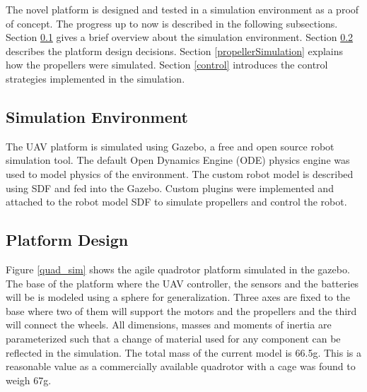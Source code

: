 \documentclass[12pt,a4paper]{report}
\begin{document}
The novel platform is designed and tested in a simulation environment as a proof of concept. The progress up to now is described in the following subsections. Section \ref{simulationEnvironment} gives a brief overview about the simulation environment. Section \ref{platformDesign} describes the platform design decisions. Section \ref{propellerSimulation} explains how the propellers were simulated. Section \ref{control} introduces the control strategies implemented in the simulation.

\subsection{Simulation Environment}
\label{simulationEnvironment}
The UAV platform is simulated using Gazebo, a free and open source robot simulation tool. The default Open Dynamics Engine (ODE) physics engine was used to model physics of the environment. The custom robot model is described using SDF and fed into the Gazebo. Custom plugins were implemented and attached to the robot model SDF to simulate propellers and control the robot.   

\subsection{Platform Design}
\label{platformDesign}
Figure \ref{quad_sim} shows the agile quadrotor platform simulated in the gazebo. The base of the platform where the UAV controller, the sensors and the batteries will be is modeled using a sphere for generalization. Three axes are fixed to the base where two of them will support the motors and the propellers and the third will connect the wheels. All dimensions, masses and moments of inertia are parameterized such that a change of material used for any component can be reflected in the simulation. The total mass of the current model is 66.5g. This is a reasonable value as a commercially available quadrotor with a cage was found to weigh 67g. 
\end{document}
